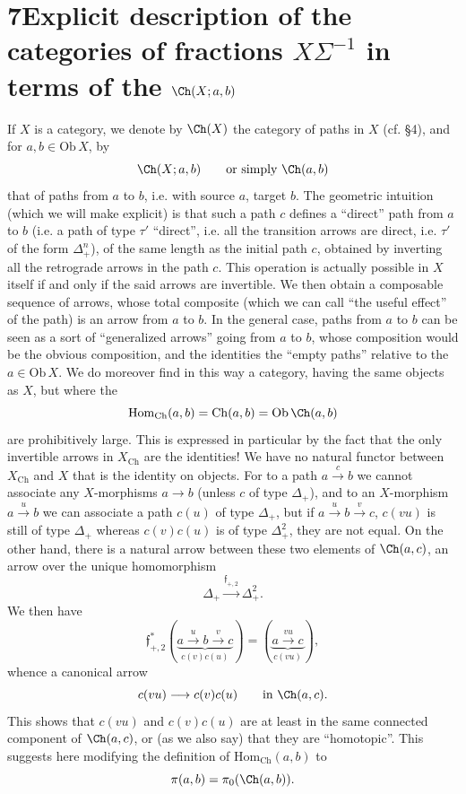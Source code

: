 \section*{7\quad Explicit description of the categories of fractions $X\Sigma^{-1}$ in terms of the $\Ch(X;a,b)$}

If $X$ is a category, we denote by $\Ch(X)$ the category of paths in $X$ (cf. §4), and for $a,b \in \mathrm{Ob}\,X$, by
\[
\Ch(X;a,b) \qquad \text{or simply } \Ch(a,b)
\]
that of paths from $a$ to $b$, i.e. with source $a$, target $b$. The geometric intuition (which we will make explicit) is that such a path $c$ defines a ``direct'' path from $a$ to $b$ (i.e. a path of type $\tau'$ ``direct'', i.e. all the transition arrows are direct, i.e. $\tau'$ of the form $\Delta_+^n$), of the same length as the initial path $c$, obtained by inverting all the retrograde arrows in the path $c$. This operation is actually possible in $X$ itself if and only if the said arrows are invertible. We then obtain a composable sequence of arrows, whose total composite (which we can call ``the useful effect'' of the path)
is an arrow from $a$ to $b$. In the general case, paths from $a$ to $b$ can be seen as a sort of ``generalized arrows'' going from $a$ to $b$, whose composition would be the obvious composition, and the identities the ``empty paths'' relative to the $a \in \mathrm{Ob}\,X$. We do moreover find in this way a category, having the same objects as $X$, but where the
\[
\mathrm{Hom}_{\mathrm{Ch}}(a,b) = \mathrm{Ch}(a,b) = \mathrm{Ob}\,\Ch(a,b)
\]
are prohibitively large. This is expressed in particular by the fact that the only invertible arrows in $X_{\mathrm{Ch}}$ are the identities! We have no natural functor between $X_{\mathrm{Ch}}$ and $X$ that is the identity on objects. For to a path $a \xrightarrow{c} b$ we cannot associate any $X$-morphisms $a \longrightarrow b$ (unless $c$ of type $\Delta_+$), and to an $X$-morphism $a \xrightarrow{u} b$ we can associate a path $c(u)$ of type $\Delta_+$, but if $a \xrightarrow{u} b \xrightarrow{v} c$, $c(vu)$ is still of type $\Delta_+$ whereas $c(v)c(u)$ is of type $\Delta_+^2$, they are not equal. On the other hand, there is a natural arrow between these two elements of $\Ch(a,c)$, an arrow over the unique homomorphism
\[
\Delta_+ \xrightarrow{\mathfrak{f}_{+,2}} \Delta_+^2.
\]
We then have
\[
\mathfrak{f}_{+,2}^*(\underbrace{a \xrightarrow{u} b \xrightarrow{v} c}_{c(v)c(u)}) = (\underbrace{a \xrightarrow{vu} c}_{c(vu)}),
\]
whence a canonical arrow
\[
c(vu) \longrightarrow c(v)c(u) \qquad \text{in } \Ch(a,c).
\]
This shows that $c(vu)$ and $c(v)c(u)$ are at least in the same connected component of $\Ch(a,c)$, or (as we also say) that they are ``homotopic''. This suggests here modifying the definition of $\mathrm{Hom}_{\mathrm{Ch}}(a,b)$ to
\[
\pi(a,b) = \pi_0(\Ch(a,b)).
\]

